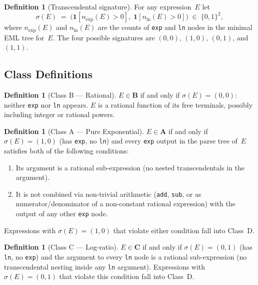 \documentclass[12pt,a4paper]{article}
\theoremstyle{definition}
\newtheorem{definition}[theorem]{Definition}
\begin{document}
\begin{definition}[Transcendental signature]
\label{def:sig}
For any expression~$E$ let
\[
  \sigma(E) \;=\;
  \bigl(\mathbf{1}[n_{\exp}(E) > 0],\;
        \mathbf{1}[n_{\ln}(E) > 0]\bigr)
  \;\in\; \{0,1\}^2,
\]
where $n_{\exp}(E)$ and $n_{\ln}(E)$ are the counts of
\texttt{exp} and \texttt{ln} nodes in the minimal EML tree for~$E$.
The four possible signatures are
$(0,0)$, $(1,0)$, $(0,1)$, and $(1,1)$.
\end{definition}

\subsection{Class Definitions}

\begin{definition}[Class B --- Rational]
\label{def:classB}
$E \in \mathbf{B}$ if and only if $\sigma(E) = (0,0)$: neither
\texttt{exp} nor \texttt{ln} appears.
$E$ is a rational function of its free terminals, possibly including
integer or rational powers.
\end{definition}

\begin{definition}[Class A --- Pure Exponential]
\label{def:classA}
$E \in \mathbf{A}$ if and only if $\sigma(E) = (1,0)$ (has \texttt{exp},
no \texttt{ln}) and every \texttt{exp} output in the parse tree of~$E$
satisfies both of the following conditions:
\begin{enumerate}
  \item Its argument is a rational sub-expression (no nested
        transcendentals in the argument).
  \item It is not combined via non-trivial arithmetic (\texttt{add},
        \texttt{sub}, or as numerator/denominator of a non-constant
        rational expression) with the output of any other \texttt{exp}
        node.
\end{enumerate}
Expressions with $\sigma(E) = (1,0)$ that violate either condition fall
into Class~D.
\end{definition}

\begin{definition}[Class C --- Log-ratio]
\label{def:classC}
$E \in \mathbf{C}$ if and only if $\sigma(E) = (0,1)$ (has \texttt{ln},
no \texttt{exp}) and the argument to every \texttt{ln} node is a rational
sub-expression (no transcendental nesting inside any \texttt{ln}
argument).
Expressions with $\sigma(E) = (0,1)$ that violate this condition fall
into Class~D.
\end{definition}
\end{document}
